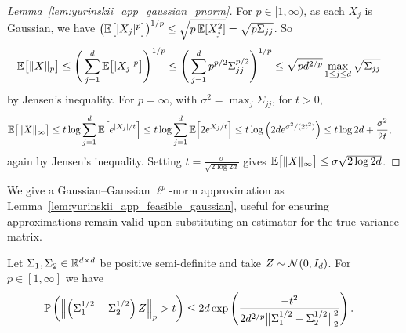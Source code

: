 \begin{proof}[Lemma~\ref{lem:yurinskii_app_gaussian_pnorm}]

  For $p \in [1, \infty)$,
  as each $X_j$ is Gaussian, we have
  $\big(\E\big[|X_j|^p\big]\big)^{1/p}
  \leq \sqrt{p\, \E[X_j^2]}
  = \sqrt{p \Sigma_{j j}}$.
  So
  \begin{align*}
    \E\big[\|X\|_p\big]
    &\leq
    \Bigg(\sum_{j=1}^d \E \big[ |X_j|^p \big] \Bigg)^{1/p}
    \leq \Bigg(\sum_{j=1}^d p^{p/2} \Sigma_{j j}^{p/2} \Bigg)^{1/p}
    \leq \sqrt{p d^{2/p}}
    \max_{1\leq j\leq d}
    \sqrt{\Sigma_{j j}}
  \end{align*}
  by Jensen's inequality.
  For $p=\infty$,
  with $\sigma^2 = \max_j \Sigma_{j j}$,
  for $t>0$,
  \begin{align*}
    \E\big[\|X\|_\infty \big]
    &\leq
    t
    \log
    \sum_{j=1}^d
    \E\Big[
      e^{|X_j| / t}
    \Big]
    \leq
    t
    \log
    \sum_{j=1}^d
    \E\Big[
      2 e^{X_j / t}
    \Big]
    \leq t \log \Big(2 d e^{\sigma^2/(2t^2)}\Big)
    \leq t \log 2 d + \frac{\sigma^2}{2t},
  \end{align*}
  again by Jensen's inequality.
  Setting $t = \frac{\sigma}{\sqrt{2 \log 2d}}$ gives
  $\E\big[\|X\|_\infty \big] \leq \sigma \sqrt{2 \log 2d}$.
\end{proof}

We give a Gaussian--Gaussian $\ell^p$-norm approximation
as Lemma~\ref{lem:yurinskii_app_feasible_gaussian}, useful for
ensuring approximations remain valid upon substituting
an estimator for the true variance matrix.

\begin{lemma}%
  \label{lem:yurinskii_app_feasible_gaussian}

  Let $\Sigma_1, \Sigma_2 \in \R^{d \times d}$ be positive semi-definite
  and take $Z \sim \cN(0, I_d)$.
  For $p \in [1, \infty]$ we have
  \begin{align*}
    \P\left(
      \left\|
      \left(\Sigma_1^{1/2} - \Sigma_2^{1/2}\right) Z
      \right\|_p
      > t
    \right)
    &\leq
    2 d \exp \left(
      \frac{-t^2}
      {2 d^{2/p} \big\|\Sigma_1^{1/2} - \Sigma_2^{1/2}\big\|_2^2}
    \right).
  \end{align*}

\end{lemma}

